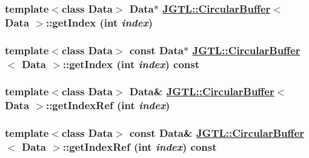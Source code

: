 \hypertarget{class_j_g_t_l_1_1_circular_buffer_88a8bd26b61f87b6e22c33c3d6d120fb}{
\subsubsection[getIndex]{\setlength{\rightskip}{0pt plus 5cm}template$<$class Data$>$ Data$\ast$ \hyperlink{class_j_g_t_l_1_1_circular_buffer}{JGTL::Circular\-Buffer}$<$ Data $>$::get\-Index (int {\em index})}}
\label{class_j_g_t_l_1_1_circular_buffer_88a8bd26b61f87b6e22c33c3d6d120fb}


\hypertarget{class_j_g_t_l_1_1_circular_buffer_2f71fdf80cac6914e0886ed2a2118f7a}{
\subsubsection[getIndex]{\setlength{\rightskip}{0pt plus 5cm}template$<$class Data$>$ const Data$\ast$ \hyperlink{class_j_g_t_l_1_1_circular_buffer}{JGTL::Circular\-Buffer}$<$ Data $>$::get\-Index (int {\em index}) const}}
\label{class_j_g_t_l_1_1_circular_buffer_2f71fdf80cac6914e0886ed2a2118f7a}


\hypertarget{class_j_g_t_l_1_1_circular_buffer_fd58c9a7ff4ead948244b1ebd673ead9}{
\subsubsection[getIndexRef]{\setlength{\rightskip}{0pt plus 5cm}template$<$class Data$>$ Data\& \hyperlink{class_j_g_t_l_1_1_circular_buffer}{JGTL::Circular\-Buffer}$<$ Data $>$::get\-Index\-Ref (int {\em index})}}
\label{class_j_g_t_l_1_1_circular_buffer_fd58c9a7ff4ead948244b1ebd673ead9}


\hypertarget{class_j_g_t_l_1_1_circular_buffer_34d6bb82f81427c2a3109dae072a1004}{
\subsubsection[getIndexRef]{\setlength{\rightskip}{0pt plus 5cm}template$<$class Data$>$ const Data\& \hyperlink{class_j_g_t_l_1_1_circular_buffer}{JGTL::Circular\-Buffer}$<$ Data $>$::get\-Index\-Ref (int {\em index}) const}}
\label{class_j_g_t_l_1_1_circular_buffer_34d6bb82f81427c2a3109dae072a1004}


